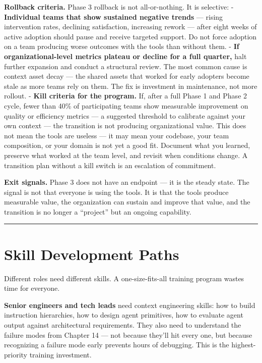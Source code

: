 \documentclass[
  a4paper,
  DIV=11,
  numbers=noendperiod]{scrreprt}
\begin{document}
\textbf{Rollback criteria.} Phase 3 rollback is not all-or-nothing. It
is selective: - \textbf{Individual teams that show sustained negative
trends} --- rising intervention rates, declining satisfaction,
increasing rework --- after eight weeks of active adoption should pause
and receive targeted support. Do not force adoption on a team producing
worse outcomes with the tools than without them. - \textbf{If
organizational-level metrics plateau or decline for a full quarter,}
halt further expansion and conduct a structural review. The most common
cause is context asset decay --- the shared assets that worked for early
adopters become stale as more teams rely on them. The fix is investment
in maintenance, not more rollout. - \textbf{Kill criteria for the
program.} If, after a full Phase 1 and Phase 2 cycle, fewer than 40\% of
participating teams show measurable improvement on quality or efficiency
metrics --- a suggested threshold to calibrate against your own context
--- the transition is not producing organizational value. This does not
mean the tools are useless --- it may mean your codebase, your team
composition, or your domain is not yet a good fit. Document what you
learned, preserve what worked at the team level, and revisit when
conditions change. A transition plan without a kill switch is an
escalation of commitment.

\textbf{Exit signals.} Phase 3 does not have an endpoint --- it is the
steady state. The signal is not that everyone is using the tools. It is
that the tools produce measurable value, the organization can sustain
and improve that value, and the transition is no longer a ``project''
but an ongoing capability.

\begin{center}\rule{0.5\linewidth}{0.5pt}\end{center}

\section{Skill Development Paths}\label{skill-development-paths}

Different roles need different skills. A one-size-fits-all training
program wastes time for everyone.

\textbf{Senior engineers and tech leads} need context engineering
skills: how to build instruction hierarchies, how to design agent
primitives, how to evaluate agent output against architectural
requirements. They also need to understand the failure modes from
Chapter 14 --- not because they'll hit every one, but because
recognizing a failure mode early prevents hours of debugging. This is
the highest-priority training investment.
\end{document}
